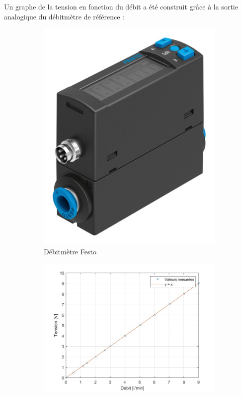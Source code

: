 \begin{itemize}
          Un graphe de la tension en fonction du débit a été construit grâce à la sortie analogique du débitmètre de référence :
          \begin{figure}[H]
              \hspace{-1cm}
              \begin{subfigure}{0.4\textwidth}
                  \centering
                  \includegraphics[scale = 0.1]{assets/figures/Festo_debitmetre.jpg}
                  \caption{Débitmètre Festo}
              \end{subfigure}
              \begin{subfigure}{0.5\textwidth}
                  \includegraphics[scale = 0.4]{assets/figures/Calibration_maison.jpg}

\end{subfigure}
\end{figure}
\end{itemize}
